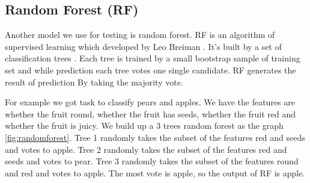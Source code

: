 \subsection{Random Forest (RF)} %
\label{random_forest}
 Another model we use for testing is random forest. RF is an algorithm of supervised learning which developed by Leo Breiman \cite{breiman2001random}. It's built by a set of classification trees \cite{breiman1984classification}. Each tree is trained by a small bootstrap sample of training set and while prediction each tree votes one single candidate. RF generates the result of prediction By taking the majority vote. 

For example we got task to classify pears and apples. We have the features are whether the fruit round, whether the fruit has seeds, whether the fruit red and whether the fruit is juicy. We build up a 3 trees random forest as the graph \ref{fig:randomforest}. Tree 1 randomly takes the subset of the features red and seeds and votes to apple. Tree 2 randomly takes the subset of the features red and seeds and votes to pear. Tree 3 randomly takes the subset of the features round and red and votes to apple. The most vote is apple, so the output of RF is apple.

